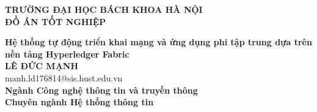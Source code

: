 \documentclass[DoAn.tex]{subfiles}
\begin{document}
\begin{titlepage}
\thispagestyle{empty}
\begin{center}

{\textbf{\large{TRƯỜNG ĐẠI HỌC BÁCH KHOA HÀ NỘI}}}\\[4cm]

{\textbf{\huge{ ĐỒ ÁN TỐT NGHIỆP}}}\\[1cm]
{\textbf{\Large{Hệ thống tự động triển khai mạng và ứng dụng phi tập trung dựa trên nền tảng Hyperledger Fabric}}\\[1cm]

{\textbf{\large{LÊ ĐỨC MẠNH}}}\\
{\large{manh.ld176814@sis.hust.edu.vn}}\\[0.5cm]

{\textbf{\large{Ngành Công nghệ thông tin và truyền thông}}}\\
{\textbf{\large{Chuyên ngành Hệ thống thông tin}}}\\

\vspace{2cm}
\begin{table}[H]
\centering
{}
\end{table}}
\end{center}



\end{titlepage}
\end{document}

